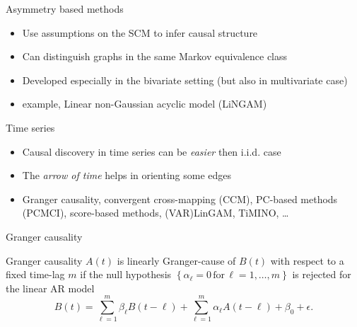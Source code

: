 \documentclass{beamer}
\begin{document}
\begin{frame}{Asymmetry based methods} 
	\begin{itemize}
		\item<1-> Use assumptions on the SCM to infer causal structure 
		\item<2-> Can distinguish graphs in the same Markov equivalence class 
		\item<3-> Developed especially in the bivariate setting (but also in multivariate case)
		\item<4-> example, Linear non-Gaussian acyclic model (LiNGAM)~\citep{shimizu2006linear} 
	\end{itemize}
\end{frame}


\begin{frame}{Time series}
\begin{itemize}
	\item Causal discovery in time series can be \emph{easier} then i.i.d. case 
	\item The \emph{arrow of time} helps in orienting some edges 
	\item<2-> Granger causality, convergent cross-mapping (CCM), PC-based methods (PCMCI), 
		score-based methods, (VAR)LinGAM, TiMINO, \ldots 
\end{itemize}
\end{frame}


\begin{frame}{Granger causality} 
\begin{block}{Granger causality}
$A(t)$ is linearly Granger-cause of $B(t)$ with 
respect to a fixed time-lag $m$ 
if the null hypothesis 
$\left\{ \alpha_\ell=0 \,\text{for}\, \ell = 1,\ldots,m \right\}$ 
is rejected for the linear AR model 
		\[B(t) = \sum_{\ell=1}^m \beta_\ell B(t-\ell) + \sum_{\ell=1}^m \alpha_\ell A(t-\ell) + \beta_0 + \epsilon.\]
	\end{block}
\end{frame}


\begin{frame}[allowframebreaks]

\end{frame}
\end{document}
